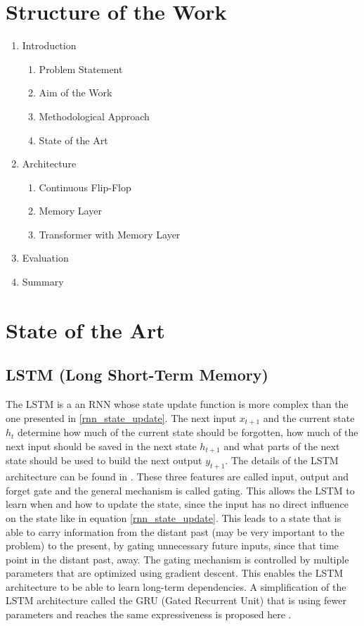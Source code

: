 \documentclass{article}
\begin{document}
    \section{Structure of the Work}
    \begin{enumerate}
        \item{Introduction}
        \begin{enumerate}
            \item{Problem Statement}
            \item{Aim of the Work}
            \item{Methodological Approach}
            \item{State of the Art}
        \end{enumerate}
        \item{Architecture}
        \begin{enumerate}
            \item{Continuous Flip-Flop}
            \item{Memory Layer}
            \item{Transformer with Memory Layer}
        \end{enumerate}
        \item{Evaluation}
        \item{Summary}
    \end{enumerate}


    \section{State of the Art}

    \subsection{LSTM (Long Short-Term Memory)}
    The LSTM is a an RNN whose state update function is more complex than the one presented in \ref{rnn_state_update}.
    The next input $x_{t+1}$ and the current state $h_{t}$ determine how much of the current state should be forgotten, how much of the next input should be saved in the next state $h_{t+1}$ and what parts of the next state should be used to build the next output $y_{t+1}$.
    The details of the LSTM architecture can be found in \cite{LSTM}.
    These three features are called input, output and forget gate and the general mechanism is called gating.
    This allows the LSTM to learn when and how to update the state, since the input has no direct influence on the state like in equation \ref{rnn_state_update}.
    This leads to a state that is able to carry information from the distant past (may be very important to the problem) to the present, by gating unnecessary future inputs, since that time point in the distant past, away.
    The gating mechanism is controlled by multiple parameters that are optimized using gradient descent.
    This enables the LSTM architecture to be able to learn long-term dependencies.
    A simplification of the LSTM architecture called the GRU (Gated Recurrent Unit) that is using fewer parameters and reaches the same expressiveness is proposed here \cite{GRU}.
\end{document}
